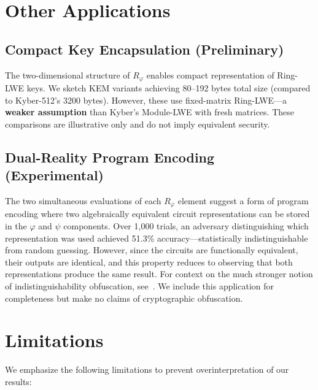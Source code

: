 \documentclass[11pt,a4paper]{article}
\begin{document}
\section{Other Applications}

\subsection{Compact Key Encapsulation (Preliminary)}

The two-dimensional structure of $R_\varphi$ enables compact representation of Ring-LWE keys. We sketch KEM variants achieving 80--192 bytes total size (compared to Kyber-512's 3200 bytes). However, these use fixed-matrix Ring-LWE---a \textbf{weaker assumption} than Kyber's Module-LWE with fresh matrices. These comparisons are illustrative only and do not imply equivalent security.

\subsection{Dual-Reality Program Encoding (Experimental)}

The two simultaneous evaluations of each $R_\varphi$ element suggest a form of program encoding where two algebraically equivalent circuit representations can be stored in the $\varphi$ and $\psi$ components. Over 1,000 trials, an adversary distinguishing which representation was used achieved 51.3\% accuracy---statistically indistinguishable from random guessing. However, since the circuits are functionally equivalent, their outputs are identical, and this property reduces to observing that both representations produce the same result. For context on the much stronger notion of indistinguishability obfuscation, see~\cite{garg2013}. We include this application for completeness but make no claims of cryptographic obfuscation.

\section{Limitations}

We emphasize the following limitations to prevent overinterpretation of our results:
\end{document}
